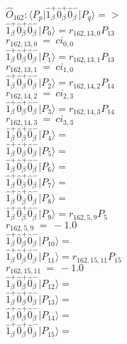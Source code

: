 \documentclass[14pt]{article}
\begin{document}
    $\hat{O}_{162}:  \langle{P_p}\vert \hat{1}_{\beta}^{+}\hat{0}_{\beta}^{+}\hat{0}_{\beta}^{-} \vert{P_q}\rangle => $ \\ 
    $ \hat{1}_{\beta}^{+}\hat{0}_{\beta}^{+}\hat{0}_{\beta}^{-} \vert{P_{0}}\rangle = {r}_{162,13,0}P_{13} $ \\ 
    ${r}_{162,13,0}\ =\ {ci}_{0,0} $ \\ 
    $ \hat{1}_{\beta}^{+}\hat{0}_{\beta}^{+}\hat{0}_{\beta}^{-} \vert{P_{1}}\rangle = {r}_{162,13,1}P_{13} $ \\ 
    ${r}_{162,13,1}\ =\ {ci}_{1,0} $ \\ 
    $ \hat{1}_{\beta}^{+}\hat{0}_{\beta}^{+}\hat{0}_{\beta}^{-} \vert{P_{2}}\rangle = {r}_{162,14,2}P_{14} $ \\ 
    ${r}_{162,14,2}\ =\ {ci}_{2,3} $ \\ 
    $ \hat{1}_{\beta}^{+}\hat{0}_{\beta}^{+}\hat{0}_{\beta}^{-} \vert{P_{3}}\rangle = {r}_{162,14,3}P_{14} $ \\ 
    ${r}_{162,14,3}\ =\ {ci}_{3,3} $ \\ 
    $ \hat{1}_{\beta}^{+}\hat{0}_{\beta}^{+}\hat{0}_{\beta}^{-} \vert{P_{4}}\rangle =  $ \\ 
    $ \hat{1}_{\beta}^{+}\hat{0}_{\beta}^{+}\hat{0}_{\beta}^{-} \vert{P_{5}}\rangle =  $ \\ 
    $ \hat{1}_{\beta}^{+}\hat{0}_{\beta}^{+}\hat{0}_{\beta}^{-} \vert{P_{6}}\rangle =  $ \\ 
    $ \hat{1}_{\beta}^{+}\hat{0}_{\beta}^{+}\hat{0}_{\beta}^{-} \vert{P_{7}}\rangle =  $ \\ 
    $ \hat{1}_{\beta}^{+}\hat{0}_{\beta}^{+}\hat{0}_{\beta}^{-} \vert{P_{8}}\rangle =  $ \\ 
    $ \hat{1}_{\beta}^{+}\hat{0}_{\beta}^{+}\hat{0}_{\beta}^{-} \vert{P_{9}}\rangle = {r}_{162,5,9}P_{5} $ \\ 
    ${r}_{162,5,9}\ =\ -1.0 $ \\ 
    $ \hat{1}_{\beta}^{+}\hat{0}_{\beta}^{+}\hat{0}_{\beta}^{-} \vert{P_{10}}\rangle =  $ \\ 
    $ \hat{1}_{\beta}^{+}\hat{0}_{\beta}^{+}\hat{0}_{\beta}^{-} \vert{P_{11}}\rangle = {r}_{162,15,11}P_{15} $ \\ 
    ${r}_{162,15,11}\ =\ -1.0 $ \\ 
    $ \hat{1}_{\beta}^{+}\hat{0}_{\beta}^{+}\hat{0}_{\beta}^{-} \vert{P_{12}}\rangle =  $ \\ 
    $ \hat{1}_{\beta}^{+}\hat{0}_{\beta}^{+}\hat{0}_{\beta}^{-} \vert{P_{13}}\rangle =  $ \\ 
    $ \hat{1}_{\beta}^{+}\hat{0}_{\beta}^{+}\hat{0}_{\beta}^{-} \vert{P_{14}}\rangle =  $ \\ 
    $ \hat{1}_{\beta}^{+}\hat{0}_{\beta}^{+}\hat{0}_{\beta}^{-} \vert{P_{15}}\rangle =  $ \\ 
    
\end{document}
